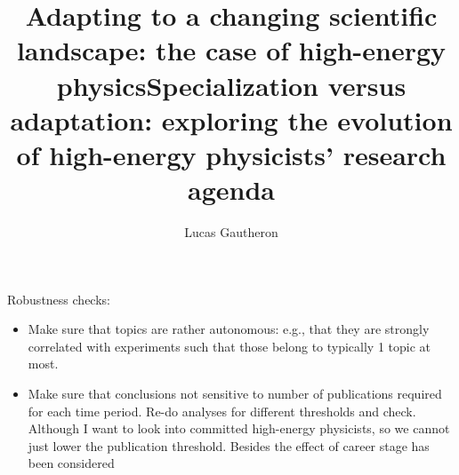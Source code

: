 \documentclass{article}
\title{Adapting to a changing scientific landscape: the case of high-energy physics}
\title{Specialization versus adaptation: exploring the evolution of high-energy physicists' research agenda}
\author{Lucas Gautheron}
\date{}
\begin{document}
\maketitle

\begin{abstract}
    
\end{abstract}







Robustness checks:

\begin{itemize}
    \item Make sure that topics are rather autonomous: e.g., that they are strongly correlated with experiments such that those belong to typically 1 topic at most. 
    \item Make sure that conclusions not sensitive to number of publications required for each time period. Re-do analyses for different thresholds and check. Although I want to look into committed high-energy physicists, so we cannot just lower the publication threshold. Besides the effect of career stage has been considered
\end{itemize}
\end{document}
